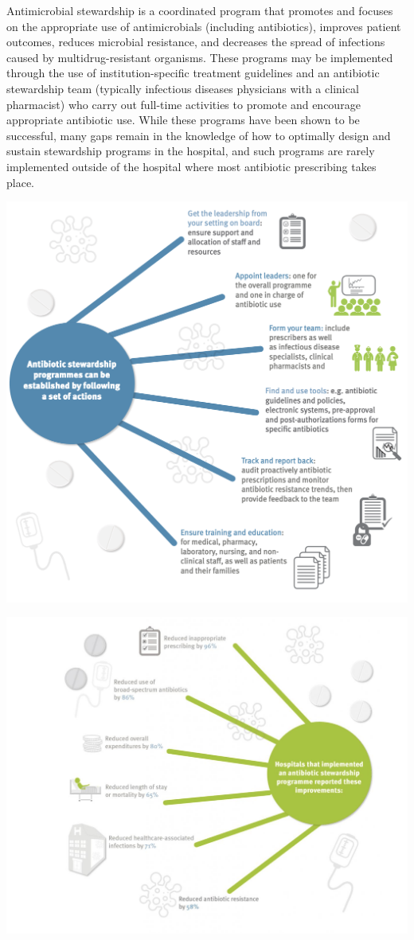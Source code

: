 \documentclass[
]{book}
\begin{document}
Antimicrobial stewardship is a coordinated program that promotes and focuses on the appropriate use of antimicrobials (including antibiotics), improves patient outcomes, reduces microbial resistance, and decreases the spread of infections caused by multidrug-resistant organisms. These programs may be implemented through the use of institution-specific treatment guidelines and an antibiotic stewardship team (typically infectious diseases physicians with a clinical pharmacist) who carry out full-time activities to promote and encourage appropriate antibiotic use. While these programs have been shown to be successful, many gaps remain in the knowledge of how to optimally design and sustain stewardship programs in the hospital, and such programs are rarely implemented outside of the hospital where most antibiotic prescribing takes place.

\includegraphics[width=8.33333in,height=\textheight]{images/stewardship actions.png}

\includegraphics[width=8.33333in,height=\textheight]{images/stewardship_impl.png}
\end{document}
